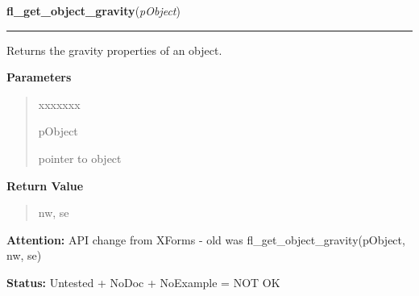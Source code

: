 \hspace{.8\funcindent}\begin{boxedminipage}{\funcwidth}

    \raggedright \textbf{fl\_get\_object\_gravity}(\textit{pObject})

    \vspace{-1.5ex}

    \rule{\textwidth}{0.5\fboxrule}
\setlength{\parskip}{2ex}
    Returns the gravity properties of an object.

\setlength{\parskip}{1ex}
      \textbf{Parameters}
      \vspace{-1ex}

      \begin{quote}
        \begin{Ventry}{xxxxxxx}

          \item[pObject]

          pointer to object

        \end{Ventry}

      \end{quote}

      \textbf{Return Value}
    \vspace{-1ex}

      \begin{quote}
      nw, se

      \end{quote}

\textbf{Attention:} API change from XForms - old was fl\_get\_object\_gravity(pObject, nw, se)



\textbf{Status:} Untested + NoDoc + NoExample = NOT OK



    \end{boxedminipage}

    \label{xformslib:library:fl_set_object_lsize}

    \vspace{0.5ex}

